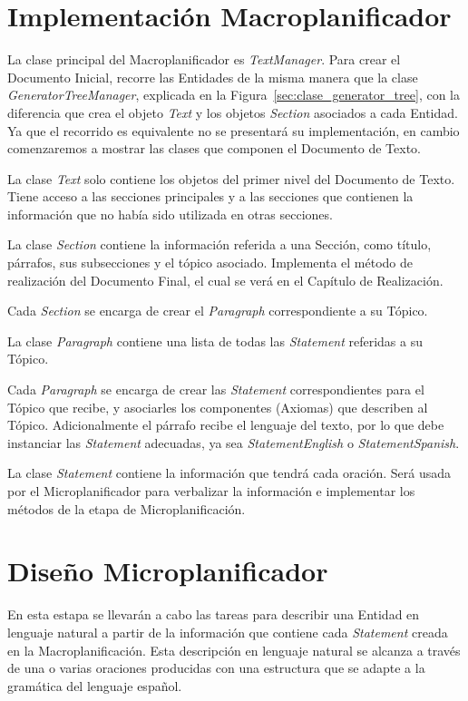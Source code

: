 \section{Implementación Macroplanificador}
La clase principal del Macroplanificador es \emph{TextManager}. Para crear el Documento Inicial, recorre las Entidades de la misma manera que la clase \emph{GeneratorTreeManager}, explicada en la Figura~\ref{sec:clase_generator_tree}, con la diferencia que crea el objeto \emph{Text} y los objetos \emph{Section} asociados a cada Entidad. Ya que el recorrido es equivalente no se presentará su implementación, en cambio comenzaremos a mostrar las clases que componen el Documento de Texto.

La clase \emph{Text} solo contiene los objetos del primer nivel del Documento de Texto. Tiene acceso a las secciones principales y a las secciones que contienen la información que no había sido utilizada en otras secciones. 

La clase \emph{Section} contiene la información referida a una Sección, como título, párrafos, sus subsecciones y el tópico asociado. Implementa el método de realización del Documento Final, el cual se verá en el Capítulo de Realización.

Cada \emph{Section} se encarga de crear el \emph{Paragraph} correspondiente a su Tópico.

La clase \emph{Paragraph} contiene una lista de todas las \emph{Statement} referidas a su Tópico. 

Cada \emph{Paragraph} se encarga de crear las \emph{Statement} correspondientes para el Tópico que recibe, y asociarles los componentes (Axiomas) que describen al Tópico. Adicionalmente el párrafo recibe el lenguaje del texto, por lo que debe instanciar las \emph{Statement} adecuadas, ya sea \emph{StatementEnglish} o \emph{StatementSpanish}.

La clase \emph{Statement} contiene la información que tendrá cada oración. Será usada por el Microplanificador para verbalizar la información e implementar los métodos de la etapa de Microplanificación. 

\section{Diseño Microplanificador}
En esta estapa se llevarán a cabo las tareas para describir una Entidad en lenguaje natural a partir de la información que contiene cada \emph{Statement} creada en la Macroplanificación. Esta descripción en lenguaje natural se alcanza a través de una o varias oraciones producidas con una estructura que se adapte a la gramática del lenguaje español.

